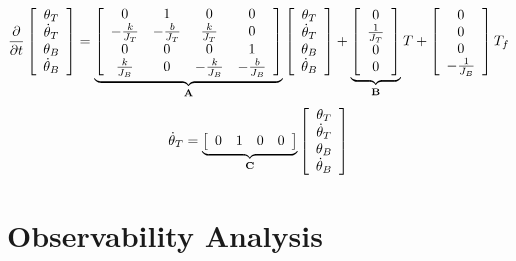 \documentclass[12pt]{article}
\begin{document}
\subsection{}
\begin{equation}
\frac{\partial}{\partial t}\left[
\begin{array}{c}
\theta_T\\
\dot\theta_T\\
\theta_B\\
\dot\theta_B
\end{array}\right]=\underbrace{\left[
\begin{array}{cccc}
0&1&0&0\\
-\frac{k}{J_T}&-\frac{b}{J_T}&\frac{k}{J_T}&0\\
0&0&0&1\\
\frac{k}{J_B}&0&-\frac{k}{J_B}&-\frac{b}{J_B}
\end{array}\right]}_\text{\textbf{A}}\left[
\begin{array}{c}
\theta_T\\
\dot\theta_T\\
\theta_B\\
\dot\theta_B
\end{array}\right]+\underbrace{\left[
\begin{array}{c}
0\\
\frac{1}{J_T}\\
0\\
0
\end{array}
\right]}_\text{\textbf{B}}T+\left[
\begin{array}{c}
0\\
0\\
0\\
-\frac{1}{J_B}
\end{array}
\right]T_f
\end{equation}
\begin{equation}
\dot\theta_T=\underbrace{\left[
\begin{array}{cccc}
0&1&0&0
\end{array}
\right]}_\text{\textbf{C}}\left[
\begin{array}{c}
\theta_T\\
\dot\theta_T\\
\theta_B\\
\dot\theta_B
\end{array}
\right]
\end{equation}
\section{Observability Analysis}
\end{document}
